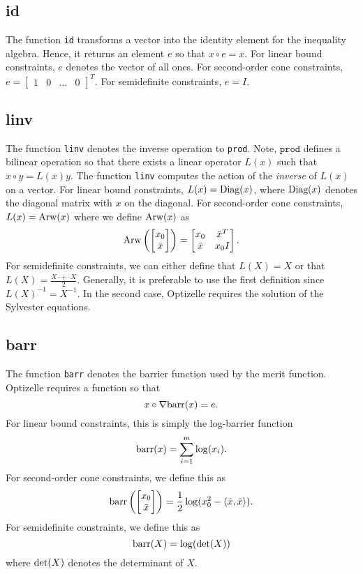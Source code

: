 \documentclass{report}
\begin{document}
\subsection{id} 

       The function \texttt{id} transforms a vector into the identity element for the inequality algebra.  Hence, it returns an element $e$ so that $x\circ e=x$.   For linear bound constraints, $e$ denotes the vector of all ones.  For second-order cone constraints, $e=\begin{bmatrix} 1 & 0 & \dots & 0\end{bmatrix}^T$.  For semidefinite constraints, $e=I$.

\subsection{linv}

        The function \texttt{linv} denotes the inverse operation to \texttt{prod}.  Note, $\texttt{prod}$ defines a bilinear operation so that there exists a linear operator $L(x)$ such that $x\circ y=L(x)y$.  The function \texttt{linv} computes the action of the {\it inverse} of $L(x)$ on a vector.  For linear bound constraints, $L(x)=\textnormal{Diag}(x)$, where $\textnormal{Diag}(x)$ denotes the diagonal matrix with $x$ on the diagonal.  For second-order cone constraints, $L(x)=\textnormal{Arw}(x)$ where we define $\textnormal{Arw}(x)$ as
$$
        \textnormal{Arw}\left(\begin{bmatrix}x_0\\\bar{x}\end{bmatrix}\right) =
\begin{bmatrix}
        x_0 & \bar{x}^T\\\bar{x} & x_0 I
\end{bmatrix}.
$$
For semidefinite constraints, we can either define that $L(X)=X$ or that $L(X)=\frac{X\cdot + \cdot X}{2}$.  Generally, it is preferable to use the first definition since $L(X)^{-1}=X^{-1}$.  In the second case, Optizelle requires the solution of the Sylvester equations.

\subsection{barr}

        The function \texttt{barr} denotes the barrier function used by the merit function.  Optizelle requires a function so that
$$
    x\circ \nabla \textnormal{barr}(x) = e.
$$
For linear bound constraints, this is simply the log-barrier function
$$
    \textnormal{barr}(x) = \sum\limits_{i=1}^m \log(x_i).
$$
For second-order cone constraints, we define this as
$$
    \textnormal{barr}\left(\begin{bmatrix}x_0\\\bar{x}\end{bmatrix}\right) = \frac{1}{2} \log(x_0^2-\langle \bar{x},\bar{x}\rangle).
$$
For semidefinite constraints, we define this as
$$
    \textnormal{barr}(X)=\log(\textnormal{det}(X))
$$
where $\textnormal{det}(X)$ denotes the determinant of $X$.
\end{document}
